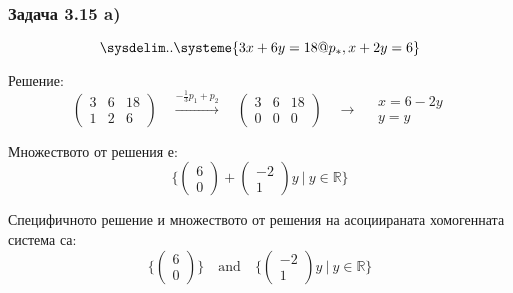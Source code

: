 \documentclass{subfiles}
\begin{document}
\subsubsection{Задача 3.15 a)}

\begin{equation*}
    \sysdelim..\systeme{
        3x + 6y = 18@p_{*},
        x + 2y = 6
    }
\end{equation*}

\noindent Решение:
\begin{equation*}
    \left(
        \begin{array}{ cc|c }
            3 & 6 & 18 \\
            1 & 2 & 6
        \end{array}
    \right)
    \quad
    \overset{-\frac{1}{3}p_{1}+p_{2}}{\longrightarrow}
    \quad
    \left(
        \begin{array}{ cc|c }
            3 & 6 & 18 \\
            0 & 0 & 0
        \end{array}
    \right)
    \quad
    \longrightarrow
    \quad
    \begin{array}{ c }
        x = 6 - 2y \\
        y = y
    \end{array}
\end{equation*}

\noindent Множеството от решения е:
\begin{equation*}
    \{
        \left(\begin{array}{ c } 6 \\ 0 \end{array}\right) +
        \left(\begin{array}{ c } -2 \\ 1 \end{array}\right) y
        \ |\ y \in \mathbb{R}
    \}
\end{equation*}

\noindent Специфичното решение и множеството от решения на асоциираната хомогенната система са:
\begin{equation*}
    \{
        \left(\begin{array}{ c } 6 \\ 0 \end{array}\right)
    \}
    \quad
    \text{and}
    \quad
    \{
        \left(\begin{array}{ c } -2 \\ 1 \end{array}\right) y
        \ |\ y \in \mathbb{R}
    \}
\end{equation*}
\end{document}

